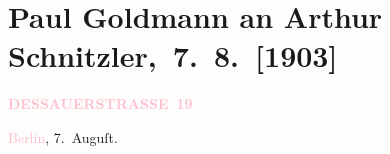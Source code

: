 

\renewcommand{\erwaehntePersonen}{Personen: Paul Goldmann, Theodore Rottenberg, Olga Schnitzler}
\renewcommand{\erwaehnteOrte}{Orte: Berlin, Dessauer Straße, Dresden, Frankgasse 1, Grand Hotel Wien, Podmokly, Prag, Wien}
\renewcommand{\erwaehnteWerke}{}
\section[ Paul Goldmann an Arthur Schnitzler, 7. 8. {[}1903{]}]{Paul Goldmann an Arthur Schnitzler, 7. 8. {[}1903{]}}
\nopagebreak{}
\rehead{ }\normalsize\beginnumbering{}
\toendnotes[C]{\smallbreak\pagebreak[2]}
\toendnotes[C]{\smallbreak}
\pstart
           \noindent{}\raggedleft{}{\pb}\textcolor{gray}{\textbf{\textcolor{pink}{DESSAUERSTRASSE 19}{}\ledrightnote{\textcolor{pink}{Dessauer Straße}}}}\pend
           
\pstart
           \textcolor{pink}{Berlin}{}\ledrightnote{\textcolor{pink}{Berlin}}, 7. Auguſt.\pend
           
